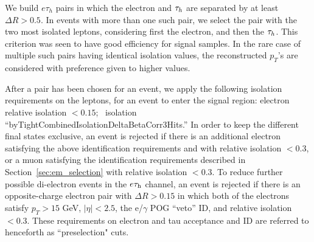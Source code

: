 We build $e\tau_h$ pairs in which the electron and
$\tau_h$ are separated by at least $\Delta R > 0.5$.  In events with
more than one such pair, we select the pair with the two most isolated
leptons, considering first the electron, and then the $\tau_h$.  This
criterion was seen to have good efficiency for signal samples.  In the
rare case of multiple such pairs having identical isolation values,
the reconstructed $p_T$'s are considered with preference given to higher values.


After a pair has been chosen for an event, we apply the following
isolation requirements on the leptons, for an event to enter the
signal region: electron relative isolation $<0.15$; \tauh ~isolation
``byTightCombinedIsolationDeltaBetaCorr3Hits.''  In order to keep the
different final states exclusive, an event is rejected if there is an
additional electron satisfying the above identification requirements
and with relative isolation $<0.3$, or a muon satisfying the
identification requirements described in
Section~\ref{sec:em_selection} with relative isolation $<0.3$.  To
reduce further possible di-electron events in the $e\tau_{\textrm{h}}$ channel, an
event is rejected if there is an opposite-charge electron pair with
$\Delta R > 0.15$ in which both of the electrons satisfy $p_T >
15$ GeV, $\vert \eta \vert < 2.5$, the e/$\gamma$ POG ``veto'' ID,
and relative isolation $<0.3$. These requirements on electron and tau acceptance and ID are referred to henceforth as ``preselection" cuts.

